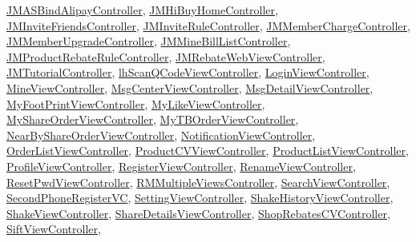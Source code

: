 \mbox{\hyperlink{interface_j_m_a_s_bind_alipay_controller}{J\+M\+A\+S\+Bind\+Alipay\+Controller}}, \mbox{\hyperlink{interface_j_m_hi_buy_home_controller}{J\+M\+Hi\+Buy\+Home\+Controller}}, \mbox{\hyperlink{interface_j_m_invite_friends_controller}{J\+M\+Invite\+Friends\+Controller}}, \mbox{\hyperlink{interface_j_m_invite_rule_controller}{J\+M\+Invite\+Rule\+Controller}}, \mbox{\hyperlink{interface_j_m_member_charge_controller}{J\+M\+Member\+Charge\+Controller}}, \mbox{\hyperlink{interface_j_m_member_upgrade_controller}{J\+M\+Member\+Upgrade\+Controller}}, \mbox{\hyperlink{interface_j_m_mine_bill_list_controller}{J\+M\+Mine\+Bill\+List\+Controller}}, \mbox{\hyperlink{interface_j_m_product_rebate_rule_controller}{J\+M\+Product\+Rebate\+Rule\+Controller}}, \mbox{\hyperlink{interface_j_m_rebate_web_view_controller}{J\+M\+Rebate\+Web\+View\+Controller}}, \mbox{\hyperlink{interface_j_m_tutorial_controller}{J\+M\+Tutorial\+Controller}}, \mbox{\hyperlink{interfacelh_scan_q_code_view_controller}{lh\+Scan\+Q\+Code\+View\+Controller}}, \mbox{\hyperlink{interface_login_view_controller}{Login\+View\+Controller}}, \mbox{\hyperlink{interface_mine_view_controller}{Mine\+View\+Controller}}, \mbox{\hyperlink{interface_msg_center_view_controller}{Msg\+Center\+View\+Controller}}, \mbox{\hyperlink{interface_msg_detail_view_controller}{Msg\+Detail\+View\+Controller}}, \mbox{\hyperlink{interface_my_foot_print_view_controller}{My\+Foot\+Print\+View\+Controller}}, \mbox{\hyperlink{interface_my_like_view_controller}{My\+Like\+View\+Controller}}, \mbox{\hyperlink{interface_my_share_order_view_controller}{My\+Share\+Order\+View\+Controller}}, \mbox{\hyperlink{interface_my_t_b_order_view_controller}{My\+T\+B\+Order\+View\+Controller}}, \mbox{\hyperlink{interface_near_by_share_order_view_controller}{Near\+By\+Share\+Order\+View\+Controller}}, \mbox{\hyperlink{interface_notification_view_controller}{Notification\+View\+Controller}}, \mbox{\hyperlink{interface_order_list_view_controller}{Order\+List\+View\+Controller}}, \mbox{\hyperlink{interface_product_c_v_view_controller}{Product\+C\+V\+View\+Controller}}, \mbox{\hyperlink{interface_product_list_view_controller}{Product\+List\+View\+Controller}}, \mbox{\hyperlink{interface_profile_view_controller}{Profile\+View\+Controller}}, \mbox{\hyperlink{interface_register_view_controller}{Register\+View\+Controller}}, \mbox{\hyperlink{interface_rename_view_controller}{Rename\+View\+Controller}}, \mbox{\hyperlink{interface_reset_pwd_view_controller}{Reset\+Pwd\+View\+Controller}}, \mbox{\hyperlink{interface_r_m_multiple_views_controller}{R\+M\+Multiple\+Views\+Controller}}, \mbox{\hyperlink{interface_search_view_controller}{Search\+View\+Controller}}, \mbox{\hyperlink{interface_second_phone_register_v_c}{Second\+Phone\+Register\+VC}}, \mbox{\hyperlink{interface_setting_view_controller}{Setting\+View\+Controller}}, \mbox{\hyperlink{interface_shake_history_view_controller}{Shake\+History\+View\+Controller}}, \mbox{\hyperlink{interface_shake_view_controller}{Shake\+View\+Controller}}, \mbox{\hyperlink{interface_share_details_view_controller}{Share\+Details\+View\+Controller}}, \mbox{\hyperlink{interface_shop_rebates_c_v_controller}{Shop\+Rebates\+C\+V\+Controller}}, \mbox{\hyperlink{interface_sift_view_controller}{Sift\+View\+Controller}}, 